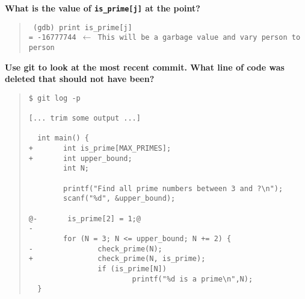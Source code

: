 \documentclass{article}
\begin{document}
\textbf{What is the value of \texttt{is\_prime[j]} at the point?}\\
\begin{quote}
  \color{violet}\tt
  (gdb) print is\_prime[j]\\
  = -16777744 $\leftarrow$ This will be a garbage value and vary person to person
\end{quote}

\textbf{Use git to look at the most recent commit. What line of code was
  deleted that should not have been?}
\begin{quote}
    \color{violet}
  \begin{lstlisting}
$ git log -p

[... trim some output ...]

  int main() {
+       int is_prime[MAX_PRIMES];
+       int upper_bound;
        int N;

        printf("Find all prime numbers between 3 and ?\n");
        scanf("%d", &upper_bound);

@-       is_prime[2] = 1;@
-
        for (N = 3; N <= upper_bound; N += 2) {
-               check_prime(N);
+               check_prime(N, is_prime);
                if (is_prime[N])
                        printf("%d is a prime\n",N);
  }
  \end{lstlisting}
\end{quote}
\end{document}
